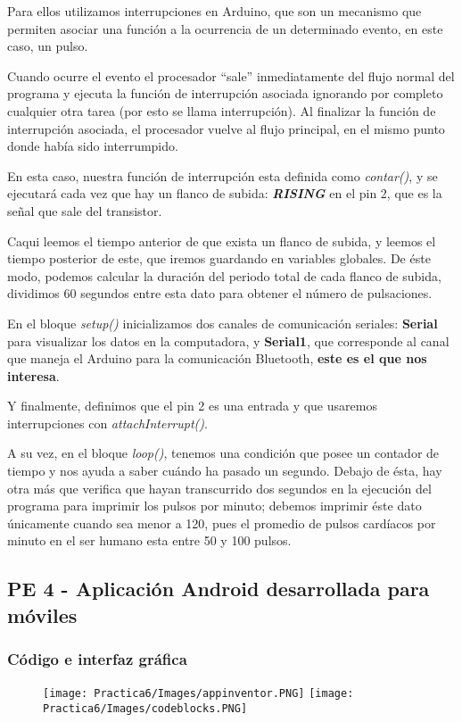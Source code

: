 \documentclass[12pt]{article}
\begin{document}
    Para ellos utilizamos interrupciones en Arduino, que son un mecanismo que permiten asociar una función a la ocurrencia de un determinado evento, en este caso, un pulso.
    
    Cuando ocurre el evento el procesador “sale” inmediatamente del flujo normal del programa y ejecuta la función de interrupción asociada ignorando por completo cualquier otra tarea (por esto se llama interrupción). Al finalizar la función de interrupción asociada, el procesador vuelve al flujo principal, en el mismo punto donde había sido interrumpido.
    
    En esta caso, nuestra función de interrupción esta definida como \textit{contar()}, y se ejecutará cada vez que hay un flanco de subida: \textit{\textbf{RISING}} en el pin 2, que es la señal que sale del transistor.
    
    
    
    Caqui leemos el tiempo anterior de que exista un flanco de subida, y leemos el tiempo posterior de este, que iremos guardando en variables globales. De éste modo, podemos calcular la duración del periodo total de cada flanco de subida, dividimos 60 segundos entre esta dato para obtener el número de pulsaciones.
    
    En el bloque \textit{setup()} inicializamos dos canales de comunicación seriales: \textbf{Serial} para visualizar los datos en la computadora, y \textbf{Serial1}, que corresponde al canal que maneja el Arduino para la comunicación Bluetooth, \textbf{este es el que nos interesa}.
    
    Y finalmente, definimos que el pin 2 es una entrada y que usaremos interrupciones con \textit{attachInterrupt()}.
    
    A su vez, en el bloque \textit{loop()}, tenemos una condición que posee un contador de tiempo y nos ayuda a saber cuándo ha pasado un segundo. Debajo de ésta, hay otra más que verifica que hayan transcurrido dos segundos en la ejecución del programa para imprimir los pulsos por minuto; debemos imprimir éste dato únicamente cuando sea menor a 120, pues el promedio de pulsos cardíacos por minuto en el ser humano esta entre 50 y 100 pulsos.
    \newpage
    \subsection{PE 4 - Aplicación Android desarrollada para móviles}
    \subsubsection{Código e interfaz gráfica}
    \begin{figure}[h!]
                \centering
                \texttt{[image: Practica6/Images/appinventor.PNG]}
                 \texttt{[image: Practica6/Images/codeblocks.PNG]}
    \end{figure}
    
\end{document}
